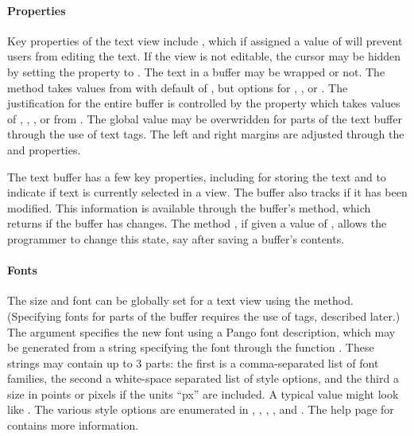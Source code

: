 \paragraph{Properties}
Key properties of the text view include , which if assigned
a value of  will prevent users from editing the text. 
If the view is not editable, the cursor may be hidden by setting the
 property to . 
The text in a buffer may be wrapped or not. The method 
takes values from  with default of , but
options for , , or . The
justification for the entire buffer is controlled by the
 property which takes values of ,
, , or  from .
The global value may be overwridden for parts of the text buffer
through the use of text tags. The left and right margins are adjusted
through the  and  properties. 

The text buffer has a few key properties, including  for
storing the text and  to indicate if text is
currently selected in a view. The buffer also tracks if it has been
modified. This information is available through the buffer's
 method, which returns 
if the buffer has changes. The method
, if given a value of ,
allows the programmer to change this state, say after saving a
buffer's contents.


\paragraph{Fonts}
The size and font can be globally set for a text view using the
 method. (Specifying fonts for parts of
the buffer requires the use of tags, described later.) The argument
 specifies the new font using
a Pango font description, which may be generated from a
string specifying the font through the function
. These strings may contain up to
3 parts: the first is a comma-separated list of font families, the
second a white-space separated list of style options, and the third a
size in points or pixels if the units ``px'' are included. A typical
value might look like . The various style options are enumerated in ,
, , , and
. The help page for 
contains more information.

